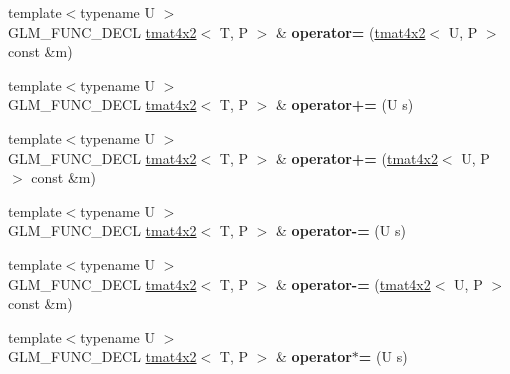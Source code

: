 \begin{DoxyCompactItemize}
\item 
\hypertarget{structglm_1_1tmat4x2_adee2eef61ff69e7b17d001ae682e1a75}{{\footnotesize template$<$typename U $>$ }\\G\-L\-M\-\_\-\-F\-U\-N\-C\-\_\-\-D\-E\-C\-L \hyperlink{structglm_1_1tmat4x2}{tmat4x2}$<$ T, P $>$ \& {\bfseries operator=} (\hyperlink{structglm_1_1tmat4x2}{tmat4x2}$<$ U, P $>$ const \&m)}\label{structglm_1_1tmat4x2_adee2eef61ff69e7b17d001ae682e1a75}

\item 
\hypertarget{structglm_1_1tmat4x2_afae8ddc6077db543d0b08537c38ea994}{{\footnotesize template$<$typename U $>$ }\\G\-L\-M\-\_\-\-F\-U\-N\-C\-\_\-\-D\-E\-C\-L \hyperlink{structglm_1_1tmat4x2}{tmat4x2}$<$ T, P $>$ \& {\bfseries operator+=} (U s)}\label{structglm_1_1tmat4x2_afae8ddc6077db543d0b08537c38ea994}

\item 
\hypertarget{structglm_1_1tmat4x2_ac80744038a97a57534282a1fc7ed6a08}{{\footnotesize template$<$typename U $>$ }\\G\-L\-M\-\_\-\-F\-U\-N\-C\-\_\-\-D\-E\-C\-L \hyperlink{structglm_1_1tmat4x2}{tmat4x2}$<$ T, P $>$ \& {\bfseries operator+=} (\hyperlink{structglm_1_1tmat4x2}{tmat4x2}$<$ U, P $>$ const \&m)}\label{structglm_1_1tmat4x2_ac80744038a97a57534282a1fc7ed6a08}

\item 
\hypertarget{structglm_1_1tmat4x2_ab687cc5fd68c36a44990b257b5413b14}{{\footnotesize template$<$typename U $>$ }\\G\-L\-M\-\_\-\-F\-U\-N\-C\-\_\-\-D\-E\-C\-L \hyperlink{structglm_1_1tmat4x2}{tmat4x2}$<$ T, P $>$ \& {\bfseries operator-\/=} (U s)}\label{structglm_1_1tmat4x2_ab687cc5fd68c36a44990b257b5413b14}

\item 
\hypertarget{structglm_1_1tmat4x2_a370c6855d2279fdd725e9d98589bc886}{{\footnotesize template$<$typename U $>$ }\\G\-L\-M\-\_\-\-F\-U\-N\-C\-\_\-\-D\-E\-C\-L \hyperlink{structglm_1_1tmat4x2}{tmat4x2}$<$ T, P $>$ \& {\bfseries operator-\/=} (\hyperlink{structglm_1_1tmat4x2}{tmat4x2}$<$ U, P $>$ const \&m)}\label{structglm_1_1tmat4x2_a370c6855d2279fdd725e9d98589bc886}

\item 
\hypertarget{structglm_1_1tmat4x2_a5ee545b358066226c5ad692deff6fea2}{{\footnotesize template$<$typename U $>$ }\\G\-L\-M\-\_\-\-F\-U\-N\-C\-\_\-\-D\-E\-C\-L \hyperlink{structglm_1_1tmat4x2}{tmat4x2}$<$ T, P $>$ \& {\bfseries operator$\ast$=} (U s)}\label{structglm_1_1tmat4x2_a5ee545b358066226c5ad692deff6fea2}


\end{DoxyCompactItemize}
